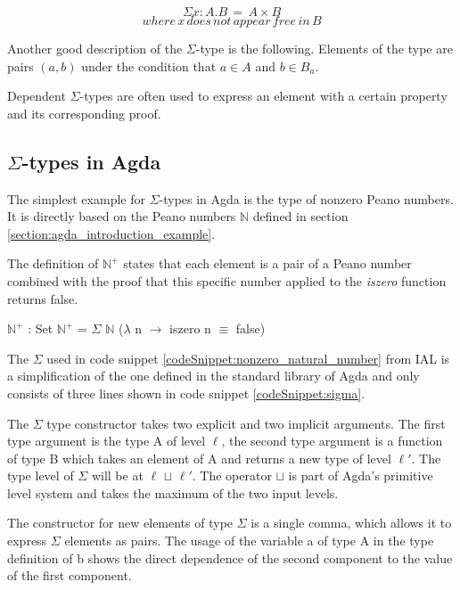 $$\Sigma x: A.B \,= \, A \times B$$
$$where \, x \, does \, not \, appear \, free \, in \, B$$


Another good description of the $\Sigma$-type is the following. 
Elements of the type are pairs $(a, b)$ under the condition that $a \in A$ and $b \in B_a$.

Dependent $\Sigma$-types are often used to express an element with a certain property and its corresponding proof.

\subsection{$\Sigma$-types in Agda}
The simplest example for $\Sigma$-types in Agda is the type of nonzero Peano numbers.
It is directly based on the Peano numbers $\mathbb{N}$ defined in section \ref{section:agda_introduction_example}.

The definition of $\mathbb{N}^+$ states that each element is a pair of a Peano number combined with the proof that this specific number applied to the \emph{iszero} function returns false.

\begin{codesnippet}[mathescape=true, caption={Definition of nonzero Peano numbers in Agda}, label={codeSnippet:nonzero_natural_number}]
$\mathbb{N}^+$ : Set
$\mathbb{N}^+$ = $\Sigma$ $\mathbb{N}$ ($\lambda$ n $\rightarrow$ iszero n $\equiv$ false)
\end{codesnippet}

The $\Sigma$ used in code snippet \ref{codeSnippet:nonzero_natural_number} from IAL is a simplification of the one defined in the standard library of Agda and only consists of three lines shown in code snippet \ref{codeSnippet:sigma}.

The $\Sigma$ type constructor takes two explicit and two implicit arguments. 
The first type argument is the type A of level $\ell$, the second type argument is a function of type B which takes an element of A and returns a new type of level $\ell '$.
The type level of $\Sigma$ will be at $\ell$ $\sqcup$ $\ell '$. The operator $\sqcup$ is part of Agda's primitive level system and takes the maximum of the two input levels.

The constructor for new elements of type $\Sigma$ is a single comma, which allows it to express $\Sigma$ elements as pairs.
The  usage of the variable a of type A in the type definition of b shows the direct dependence of the second component to the value of the first component.

